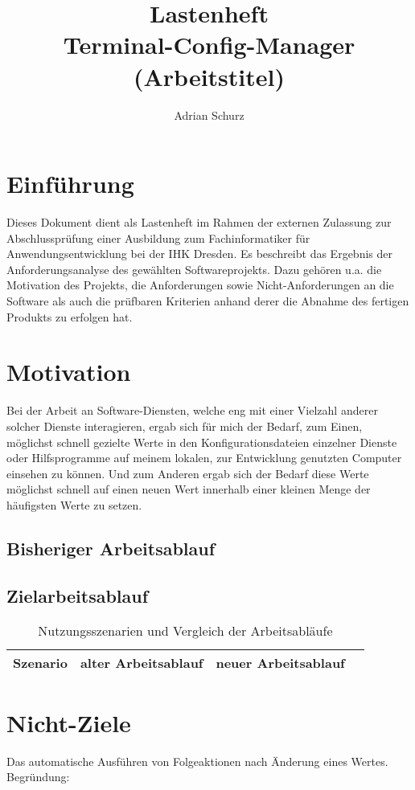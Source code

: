 \documentclass[a4paper,11pt]{article}
\author{Adrian Schurz}
\title{Lastenheft\\[0.2em]\smaller{}Terminal-Config-Manager (Arbeitstitel)}
\begin{document}
\maketitle
{}
\newpage
{}
\tableofcontents

\section{Einführung}
Dieses Dokument dient als Lastenheft im Rahmen der externen Zulassung  zur Abschlussprüfung einer Ausbildung zum Fachinformatiker für Anwendungsentwicklung bei der IHK Dresden. Es beschreibt das Ergebnis der Anforderungsanalyse des gewählten Softwareprojekts. Dazu gehören u.a. die Motivation des Projekts, die Anforderungen sowie Nicht-Anforderungen an die Software als auch die prüfbaren Kriterien anhand derer die Abnahme des fertigen Produkts zu erfolgen hat.

\section{Motivation}
Bei der Arbeit an Software-Diensten, welche eng mit einer Vielzahl anderer solcher Dienste interagieren, ergab sich für mich der Bedarf, zum Einen, möglichst schnell gezielte Werte in den Konfigurationsdateien einzelner Dienste oder Hilfsprogramme auf meinem lokalen, zur Entwicklung genutzten Computer einsehen zu können. Und zum Anderen ergab sich der Bedarf diese Werte möglichst schnell auf einen neuen Wert innerhalb einer kleinen Menge der häufigsten Werte zu setzen.

\subsection{Bisheriger Arbeitsablauf}
\subsection{Zielarbeitsablauf}

\begin{center}
	\begin{table}[h]
		\caption{Nutzungsszenarien und Vergleich der Arbeitsabläufe}
		\begin{tabularx}{0.9\textwidth}{|c|c|c|>{\raggedright\arraybackslash}X|}
			\hline
			Szenario & alter Arbeitsablauf & neuer Arbeitsablauf \\
			\hline
		\end{tabularx}
	\end{table}
\end{center}

\section{Nicht-Ziele}
Das automatische Ausführen von Folgeaktionen nach Änderung eines Wertes. Begründung:
\end{document}
